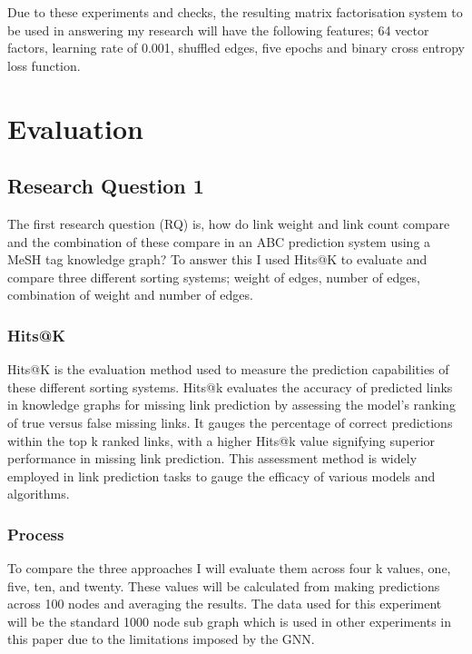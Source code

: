 \documentclass{l4proj}
\begin{document}
Due to these experiments and checks, the resulting matrix factorisation system to be used in answering my research will have the following features; 64 vector factors, learning rate of 0.001, shuffled edges, five epochs and binary cross entropy loss function. \\

\chapter{Evaluation} 

\section{Research Question 1}

The first research question (RQ) is, how do link weight and link count compare and the combination of these compare in an ABC prediction system using a MeSH tag knowledge graph? To answer this I used Hits@K to evaluate and compare three different sorting systems; weight of edges, number of edges, combination of weight and number of edges. \\

\subsection{Hits@K}

Hits@K is the evaluation method used to measure the prediction capabilities of these different sorting systems. Hits@k evaluates the accuracy of predicted links in knowledge graphs for missing link prediction by assessing the model's ranking of true versus false missing links. It gauges the percentage of correct predictions within the top k ranked links, with a higher Hits@k value signifying superior performance in missing link prediction. This assessment method is widely employed in link prediction tasks to gauge the efficacy of various models and algorithms. \\

\subsection{Process}

To compare the three approaches I will evaluate them across four k values, one, five, ten, and twenty. These values will be calculated from making predictions across 100 nodes and averaging the results. The data used for this experiment will be the standard 1000 node sub graph which is used in other experiments in this paper due to the limitations imposed by the GNN.\\
\end{document}
